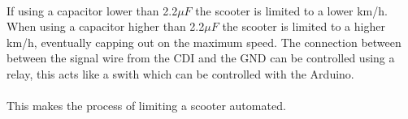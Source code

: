 \documentclass[a4paper]{article}
\begin{document}
\\
If using a capacitor lower than 2.2$\mu F$ the scooter is limited to a lower km/h. 
When using a capacitor higher than 2.2$\mu F $ the scooter is limited to a higher km/h, eventually capping out on the maximum speed.
The connection between between the signal wire from the CDI and the GND can be controlled using a relay, this acts like a swith which can be controlled with the Arduino.
\\ \\
This makes the process of limiting a scooter automated.
\newpage


\end{document}
